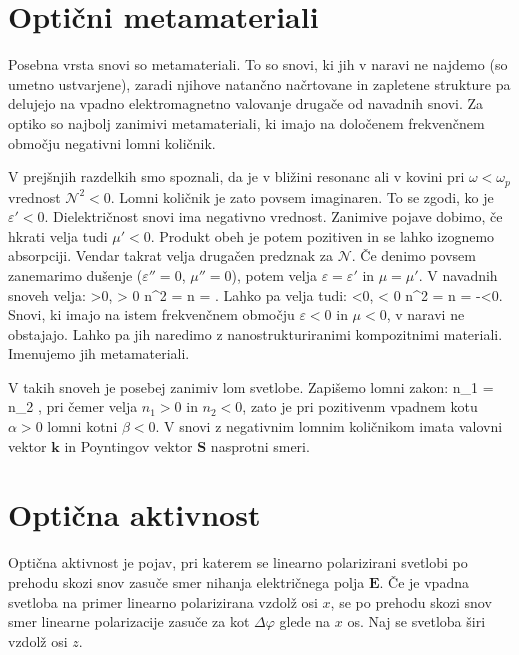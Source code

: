 \section{Optični metamateriali}
Posebna vrsta snovi so metamateriali. To so snovi, ki jih v naravi ne najdemo (so umetno
ustvarjene), zaradi njihove natančno načrtovane in zapletene strukture pa delujejo na 
vpadno elektromagnetno valovanje drugače od navadnih snovi. Za optiko so najbolj zanimivi
metamateriali, ki imajo na določenem frekvenčnem območju negativni lomni količnik.

V prejšnjih razdelkih smo spoznali, da je v bližini resonanc ali v 
kovini pri $\omega <\omega_p$ vrednost $\mathcal{N}^2 <0$.
Lomni količnik je zato povsem imaginaren. To se zgodi, ko je $\varepsilon'<0$. Dielektričnost
snovi ima negativno vrednost. Zanimive pojave dobimo, če hkrati velja tudi $\mu'<0$. Produkt
obeh je potem pozitiven in se lahko izognemo absorpciji. Vendar takrat velja drugačen
predznak za $\mathcal{N}$. Če denimo povsem zanemarimo dušenje ($\varepsilon''=0$, $\mu''=0$), 
potem velja $\varepsilon=\varepsilon'$ in $\mu  = \mu'$.
V navadnih snoveh velja:
\beq
\varepsilon >0, \mu > 0 \qquad \Rightarrow \qquad n^2 = \varepsilon \mu 
\qquad \Rightarrow \qquad n = \sqrt{\varepsilon\mu}. 
\label{eq:09_37m}
\eeq
Lahko pa velja tudi:
\beq
\varepsilon <0, \mu < 0 \qquad \Rightarrow \qquad n^2 = \varepsilon \mu 
\qquad \Rightarrow \qquad n = -\sqrt{\varepsilon\mu}<0. 
\label{eq:09_38}
\eeq
Snovi, ki imajo na istem frekvenčnem območju $\varepsilon<0$ in $\mu<0$, v naravi ne 
obstajajo. Lahko pa jih naredimo z nanostrukturiranimi kompozitnimi materiali. Imenujemo
jih metamateriali. 

V takih snoveh je posebej zanimiv lom svetlobe. Zapišemo lomni zakon:
\beq
n_1 \sin\alpha = n_2 \sin\beta,
\label{eq:09_39}
\eeq
pri čemer velja $n_1>0$ in $n_2<0$, zato je pri pozitivenm vpadnem kotu $\alpha >0$
lomni kotni $\beta <0$. V snovi z negativnim lomnim količnikom imata valovni vektor
$\mathbf{k}$ in Poyntingov vektor $\mathbf{S}$ nasprotni smeri.

\section{Optična aktivnost}
Optična aktivnost je pojav, pri katerem se linearno polarizirani svetlobi po prehodu
skozi snov zasuče smer nihanja električnega polja $\mathbf{E}$. Če je vpadna svetloba na primer
linearno polarizirana vzdolž osi $x$, se po prehodu skozi snov smer linearne polarizacije
zasuče za kot $\Delta \varphi$ glede na $x$ os. Naj se svetloba širi vzdolž osi $z$.

